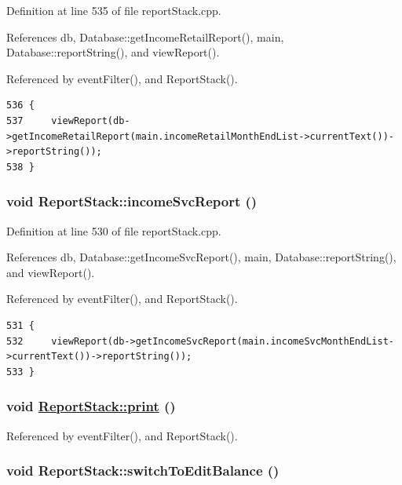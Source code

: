 Definition at line 535 of file report\-Stack.cpp.

References db, Database::get\-Income\-Retail\-Report(), main, Database::report\-String(), and view\-Report().

Referenced by event\-Filter(), and Report\-Stack().

\footnotesize\begin{verbatim}536 {
537     viewReport(db->getIncomeRetailReport(main.incomeRetailMonthEndList->currentText())->reportString());
538 }
\end{verbatim}\normalsize 


\hypertarget{classReportStack_k12}{
\subsubsection[incomeSvcReport]{\setlength{\rightskip}{0pt plus 5cm}void Report\-Stack::income\-Svc\-Report ()}}
\label{classReportStack_k12}


Definition at line 530 of file report\-Stack.cpp.

References db, Database::get\-Income\-Svc\-Report(), main, Database::report\-String(), and view\-Report().

Referenced by event\-Filter(), and Report\-Stack().

\footnotesize\begin{verbatim}531 {
532     viewReport(db->getIncomeSvcReport(main.incomeSvcMonthEndList->currentText())->reportString());
533 }
\end{verbatim}\normalsize 


\hypertarget{classReportStack_k17}{
\subsubsection[print]{\setlength{\rightskip}{0pt plus 5cm}void \hyperlink{classReportStack_r84}{Report\-Stack::print} ()}}
\label{classReportStack_k17}




Referenced by event\-Filter(), and Report\-Stack().\hypertarget{classReportStack_k14}{
\subsubsection[switchToEditBalance]{\setlength{\rightskip}{0pt plus 5cm}void Report\-Stack::switch\-To\-Edit\-Balance ()}}
\label{classReportStack_k14}


